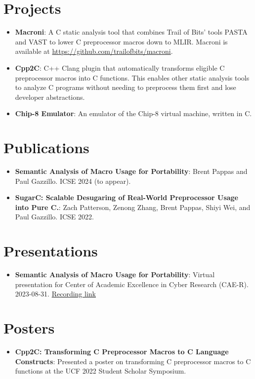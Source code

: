 \documentclass[a4paper,20pt]{article}
\newcommand{\resumeItem}[2]{
  \item\small{
    \textbf{#1}{: #2 \vspace{-2pt}}
  }
}
\newcommand{\resumeSubItem}[2]{\resumeItem{#1}{#2}\vspace{-3pt}}
\newcommand{\resumeSubHeadingListStart}{\begin{itemize}[leftmargin=*, label={}]}
\newcommand{\resumeSubHeadingListEnd}{\end{itemize}}
\begin{document}
\vspace{-5pt}
\section{Projects}
\resumeSubHeadingListStart
\resumeItem{Macroni}
{A C static analysis tool that combines Trail of Bits' tools
  PASTA and VAST to lower C preprocessor macros down to MLIR.
  Macroni is available at \href{https://github.com/trailofbits/macroni}{https://github.com/trailofbits/macroni}.}
\resumeSubItem
{Cpp2C}
{C++ Clang plugin that automatically transforms eligible C preprocessor macros into C functions.
  This enables other static analysis tools to analyze C programs without needing to preprocess them first and lose developer abstractions.}
\vspace{2pt}
\resumeSubItem
{Chip-8 Emulator}
{An emulator of the Chip-8 virtual machine, written in C.}
\resumeSubHeadingListEnd

\vspace{-5pt}
\section{Publications}
\resumeSubHeadingListStart

\resumeSubItem
{Semantic Analysis of Macro Usage for Portability}
{Brent Pappas and Paul Gazzillo. ICSE 2024 (to appear).}

\resumeSubItem
{SugarC: Scalable Desugaring of Real-World Preprocessor Usage into Pure C.}
{Zach Patterson, Zenong Zhang, Brent Pappas, Shiyi Wei, and Paul Gazzillo. ICSE 2022.}
\resumeSubHeadingListEnd

\vspace{-5pt}
\section{Presentations}
\resumeSubHeadingListStart
\resumeSubItem
{Semantic Analysis of Macro Usage for Portability}
{Virtual presentation for Center of Academic Excellence in Cyber Research (CAE-R). 2023-08-31. \href{https://drive.google.com/file/d/1xCd34w54hs1iyaoXHz0MUkwlH-fP3HLo/view} {Recording link}}
\resumeSubHeadingListEnd

\vspace{-5pt}
\section{Posters}
\resumeSubHeadingListStart
\resumeSubItem
{Cpp2C: Transforming C Preprocessor Macros to C Language Constructs}
{Presented a poster on transforming C preprocessor macros to C functions at the UCF 2022 Student Scholar Symposium.}
\resumeSubHeadingListEnd
\end{document}
